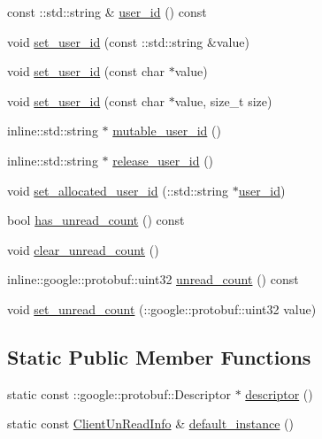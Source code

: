 \begin{DoxyCompactItemize}
const \+::std\+::string \& \hyperlink{class_i_m_1_1_base_define_1_1_client_un_read_info_a3d2ecb030f22f71d127c2ccf84f64ce1}{user\+\_\+id} () const 
\item 
void \hyperlink{class_i_m_1_1_base_define_1_1_client_un_read_info_a204031813cf0e01b2bbdcad1c9c982ec}{set\+\_\+user\+\_\+id} (const \+::std\+::string \&value)
\item 
void \hyperlink{class_i_m_1_1_base_define_1_1_client_un_read_info_ad7476747c16878445c32f3dd7bc36536}{set\+\_\+user\+\_\+id} (const char $\ast$value)
\item 
void \hyperlink{class_i_m_1_1_base_define_1_1_client_un_read_info_a42a17c60448d10d810d9190269744a50}{set\+\_\+user\+\_\+id} (const char $\ast$value, size\+\_\+t size)
\item 
inline\+::std\+::string $\ast$ \hyperlink{class_i_m_1_1_base_define_1_1_client_un_read_info_a8ad40078e247f7fe82777881aeea4c9c}{mutable\+\_\+user\+\_\+id} ()
\item 
inline\+::std\+::string $\ast$ \hyperlink{class_i_m_1_1_base_define_1_1_client_un_read_info_a412a6db9d074e3d92419de7d6fcc2c48}{release\+\_\+user\+\_\+id} ()
\item 
void \hyperlink{class_i_m_1_1_base_define_1_1_client_un_read_info_a0e9d31602ffe9da27e92d86d5650df3e}{set\+\_\+allocated\+\_\+user\+\_\+id} (\+::std\+::string $\ast$\hyperlink{class_i_m_1_1_base_define_1_1_client_un_read_info_a3d2ecb030f22f71d127c2ccf84f64ce1}{user\+\_\+id})
\item 
bool \hyperlink{class_i_m_1_1_base_define_1_1_client_un_read_info_a53e2394ced3d0bc9f54ab8a88c1a8096}{has\+\_\+unread\+\_\+count} () const 
\item 
void \hyperlink{class_i_m_1_1_base_define_1_1_client_un_read_info_a376f718a491360d654ad251cc9b26905}{clear\+\_\+unread\+\_\+count} ()
\item 
inline\+::google\+::protobuf\+::uint32 \hyperlink{class_i_m_1_1_base_define_1_1_client_un_read_info_a2031c22c485bd4c7586aa19882fcf251}{unread\+\_\+count} () const 
\item 
void \hyperlink{class_i_m_1_1_base_define_1_1_client_un_read_info_af24c181979bdbb345f036f94f80b962d}{set\+\_\+unread\+\_\+count} (\+::google\+::protobuf\+::uint32 value)
\end{DoxyCompactItemize}
\subsection*{Static Public Member Functions}
\begin{DoxyCompactItemize}
\item 
static const \+::google\+::protobuf\+::\+Descriptor $\ast$ \hyperlink{class_i_m_1_1_base_define_1_1_client_un_read_info_a50fbf9fa59975d17cbb53edb11019a09}{descriptor} ()
\item 
static const \hyperlink{class_i_m_1_1_base_define_1_1_client_un_read_info}{Client\+Un\+Read\+Info} \& \hyperlink{class_i_m_1_1_base_define_1_1_client_un_read_info_adcce710c1c7884176a6cad44ef473a2b}{default\+\_\+instance} ()
\end{DoxyCompactItemize}
